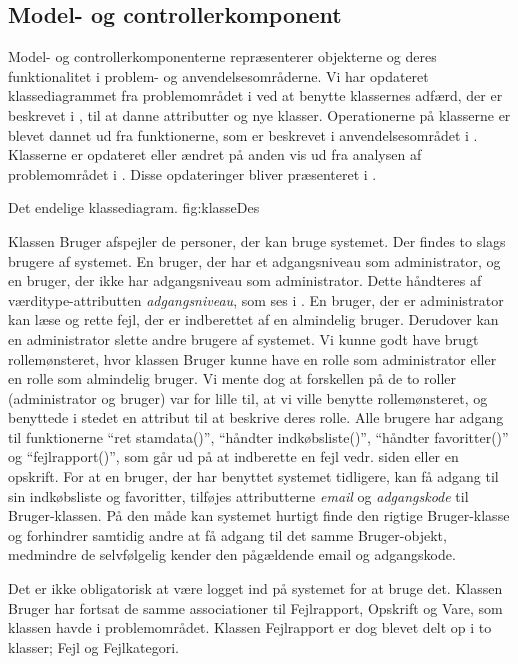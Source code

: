 \subsection{Model- og controllerkomponent}
\label{sec:modelfunktion}

Model- og controllerkomponenterne repræsenterer objekterne og deres funktionalitet i problem- og anvendelsesområderne. Vi har opdateret klassediagrammet fra problemområdet i  ved at benytte klassernes adfærd, der er beskrevet i , til at danne attributter og nye klasser. Operationerne på klasserne er blevet dannet ud fra funktionerne, som er beskrevet i anvendelsesområdet i . Klasserne er opdateret eller ændret på anden vis ud fra analysen af problemområdet i . Disse opdateringer bliver præsenteret i .


	{Det endelige klassediagram.}
	{fig:klasseDes}

Klassen Bruger afspejler de personer, der kan bruge systemet. Der findes to slags brugere af systemet. En bruger, der har et adgangsniveau som administrator, og en bruger, der ikke har adgangsniveau som administrator. Dette håndteres af værditype-attributten \textit{adgangsniveau}, som ses i . En bruger, der er administrator kan læse og rette fejl, der er indberettet af en almindelig bruger. Derudover kan en administrator slette andre brugere af systemet. Vi kunne godt have brugt rollemønsteret, hvor klassen Bruger kunne have en rolle som administrator eller en rolle som almindelig bruger. Vi mente dog at forskellen på de to roller (administrator og bruger) var for lille til, at vi ville benytte rollemønsteret, og benyttede i stedet en attribut til at beskrive deres rolle. Alle brugere har adgang til funktionerne ``ret stamdata()'', ``håndter indkøbsliste()'', ``håndter favoritter()'' og ``fejlrapport()'', som går ud på at indberette en fejl vedr. siden eller en opskrift.
For at en bruger, der har benyttet systemet tidligere, kan få adgang til sin indkøbsliste og favoritter, tilføjes attributterne \textit{email} og \textit{adgangskode} til Bruger-klassen. På den måde kan systemet hurtigt finde den rigtige Bruger-klasse og forhindrer samtidig andre at få adgang til det samme Bruger-objekt, medmindre de selvfølgelig kender den pågældende email og adgangskode.

Det er ikke obligatorisk at være logget ind på systemet for at bruge det. Klassen Bruger har fortsat de samme associationer til Fejlrapport, Opskrift og Vare, som klassen havde i problemområdet. Klassen Fejlrapport er dog blevet delt op i to klasser; Fejl og Fejlkategori.

